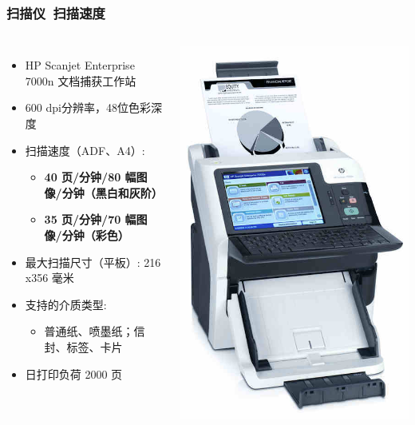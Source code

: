 \documentclass{beamer}
\begin{document}
\begin{frame}
	\frametitle{扫描仪~{\small 扫描速度}}
	\begin{columns}
		\begin{itemize}
			\item {\small HP Scanjet Enterprise 7000n 文档捕获工作站}
			\item {\tiny 600 dpi分辨率，48位色彩深度}
			\item {\tiny 扫描速度（ADF、A4）: }
			\begin{itemize}
				\item {\tiny \textbf{40 页/分钟/80 幅图像/分钟（黑白和灰阶）}}
				\item {\tiny \textbf{35 页/分钟/70 幅图像/分钟（彩色）}}
			\end{itemize}
			\item {\tiny 最大扫描尺寸（平板）: 216 x356 毫米}
			\item {\tiny 支持的介质类型: }
			\begin{itemize}
				\item {\tiny 普通纸、喷墨纸；信封、标签、卡片}
			\end{itemize}
			\item {\tiny 日打印负荷 2000 页}
		\end{itemize}
		\includegraphics[width=.9\textwidth]{images/scanjet7000.jpg}
	\end{columns}
\end{frame}
\end{document}
